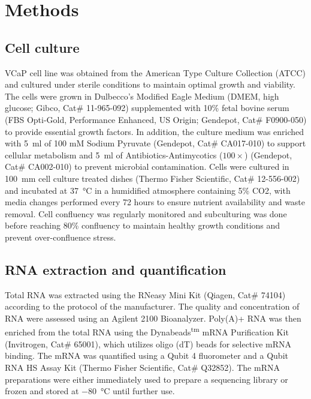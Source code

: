 \documentclass[pdflatex,sn-nature, lineno]{sn-jnl}%
\theoremstyle{thmstyleone}%
\theoremstyle{thmstyletwo}%
\theoremstyle{thmstylethree}%
\begin{document}
\section{Methods}\label{sec:methods}

\subsection{Cell culture}

VCaP cell line was obtained from the American Type Culture Collection (ATCC) and cultured under sterile conditions to maintain optimal growth and viability.
The cells were grown in Dulbecco's Modified Eagle Medium (DMEM, high glucose; Gibco, Cat\# 11-965-092) supplemented with 10\% fetal bovine serum (FBS Opti-Gold, Performance Enhanced, US Origin; Gendepot, Cat\# F0900-050) to provide essential growth factors.
In addition, the culture medium was enriched with \SI{5}{\ml} of 100 mM Sodium Pyruvate (Gendepot, Cat\# CA017-010) to support cellular metabolism and \SI{5}{\ml} of Antibiotics-Antimycotics (\( 100\times \)) (Gendepot, Cat\# CA002-010) to prevent microbial contamination.
Cells were cultured in \SI{100}{\mm} cell culture treated dishes (Thermo Fisher Scientific, Cat\# 12-556-002) and incubated at \SI{37}{\degreeCelsius} in a humidified atmosphere containing 5\% CO2, with media changes performed every 72 hours to ensure nutrient availability and waste removal.
Cell confluency was regularly monitored and subculturing was done before reaching 80\% confluency to maintain healthy growth conditions and prevent over-confluence stress.

\subsection{RNA extraction and quantification}

Total RNA was extracted using the RNeasy Mini Kit (Qiagen, Cat\# 74104) according to the protocol of the manufacturer.
The quality and concentration of RNA were assessed using an Agilent 2100 Bioanalyzer.
Poly(A)+ RNA was then enriched from the total RNA using the Dynabeads\textsuperscript{tm} mRNA Purification Kit (Invitrogen, Cat\# 65001), which utilizes oligo (dT) beads for selective mRNA binding.
The mRNA was quantified using a Qubit 4 fluorometer and a Qubit RNA HS Assay Kit (Thermo Fisher Scientific, Cat\# Q32852).
The mRNA preparations were either immediately used to prepare a sequencing library or frozen and stored at \SI{-80}{\degreeCelsius} until further use.
\end{document}
